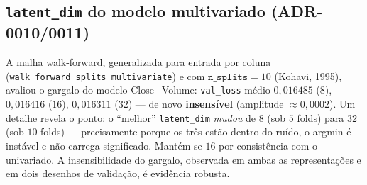 \subsection{\texttt{latent\_dim} do modelo multivariado (ADR-0010/0011)}
\label{sec:m9-latent}
A malha walk-forward, generalizada para entrada por coluna
(\texttt{walk\_forward\_splits\_multivariate}) e com $\texttt{n\_splits}=10$ (Kohavi, 1995),
avaliou o gargalo do modelo Close+Volume: \texttt{val\_loss} médio $0{,}016485$ ($8$),
$0{,}016416$ ($16$), $0{,}016311$ ($32$) --- de novo \textbf{insensível} (amplitude
$\approx 0{,}0002$). Um detalhe revela o ponto: o ``melhor'' \texttt{latent\_dim} \emph{mudou} de
$8$ (sob $5$ folds) para $32$ (sob $10$ folds) --- precisamente porque os três estão dentro do
ruído, o argmin é instável e não carrega significado. Mantém-se $16$ por consistência com o
univariado. A insensibilidade do gargalo, observada em ambas as representações e em dois desenhos
de validação, é evidência robusta.
